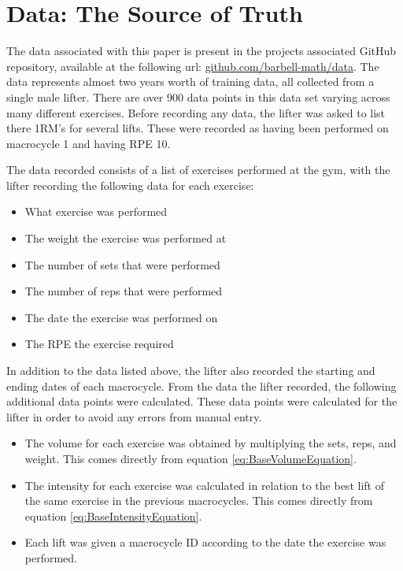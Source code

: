 \chapter{
    Data: The Source of Truth
}
\label{sec:DataSection}

The data associated with this paper is present in the projects associated GitHub repository, available at the following url:  \url{github.com/barbell-math/data}.
The data represents almost two years worth of training data, all collected from a single male lifter. There are over 900 data points in this data set varying across many different exercises. Before recording any data, the lifter was asked to list there 1RM's for several lifts. These were recorded as having been performed on macrocycle 1 and having RPE 10.

The data recorded consists of a list of exercises performed at the gym, with the lifter recording the following data for each exercise:

\begin{itemize}
    \item What exercise was performed
    \item The weight the exercise was performed at
    \item The number of sets that were performed
    \item The number of reps that were performed
    \item The date the exercise was performed on
    \item The RPE the exercise required
\end{itemize}

In addition to the data listed above, the lifter also recorded the starting and ending dates of each macrocycle. From the data the lifter recorded, the following additional data points were calculated. These data points were calculated for the lifter in order to avoid any errors from manual entry.

\begin{itemize}
    \item The volume for each exercise was obtained by multiplying the sets, reps, and weight. This comes directly from equation \ref{eq:BaseVolumeEquation}.
    \item The intensity for each exercise was calculated in relation to the best lift of the same exercise in the previous macrocycles. This comes directly from equation \ref{eq:BaseIntensityEquation}.
    \item Each lift was given a macrocycle ID according to the date the exercise was performed.
\end{itemize}


